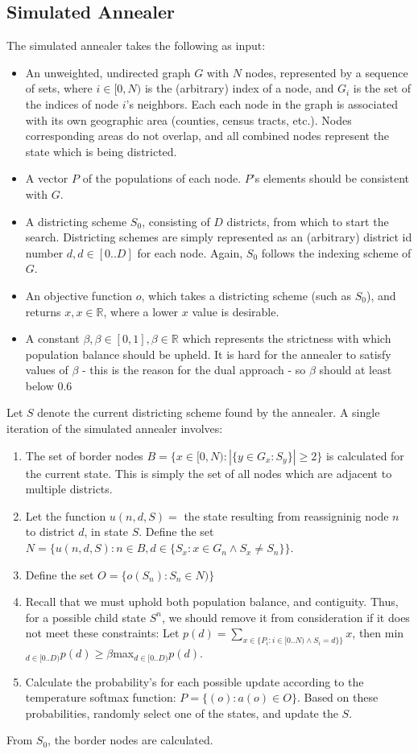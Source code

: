 \documentclass{article}
\begin{document}
\subsection{Simulated Annealer}
The simulated annealer takes the following as input:
\begin{itemize}
    \item An unweighted, undirected graph $G$ with $N$ nodes, represented by a sequence of sets, where $i\in[0, N)$ is the (arbitrary) index of a node, and $G_i$ is the set of the indices of node $i$'s neighbors. Each each node in the graph is associated with its own geographic area (counties, census tracts, etc.). Nodes corresponding areas do not overlap, and all combined nodes represent the state which is being districted.
    \item A vector $P$ of the populations of each node. $P$'s elements should be consistent with $G$.
    \item A districting scheme $S_0$, consisting of $D$ districts, from which to start the search. Districting schemes are simply represented as an (arbitrary) district id number $d, d\in[0..D]$ for each node. Again, $S_0$ follows the indexing scheme of $G$.
    \item An objective function $o$, which takes a districting scheme (such as $S_0$), and returns $x, x\in\mathbb{R}$, where a lower $x$ value is desirable.
    \item A constant $\beta, \beta\in[0, 1], \beta\in\mathbb{R}$ which represents the strictness with which population balance should be upheld. It is hard for the annealer to satisfy values of $\beta$ - this is the reason for the dual approach - so $\beta$ should at least below $0.6$
\end{itemize}
Let $S$ denote the current districting scheme found by the annealer. A single iteration of the simulated annealer involves:
\begin{enumerate}
    \item The set of border nodes $B=\{x\in[0, N): |\{y\in G_x: S_y\}|\geq2\}$ is calculated for the current state. This is simply the set of all nodes which are adjacent to multiple districts.
    \item Let the function $u(n, d, S)=$ the state resulting from reassigninig node $n$ to district $d$, in state $S$. Define the set $N = \{u(n, d, S): n \in B, d\in \{S_x: x\in G_n\land S_x\neq S_n\}\}$.
    \item Define the set $O = \{o(S_n): S_n\in N)\}$
    \item Recall that we must uphold both population balance, and contiguity. Thus, for a possible child state $S^n$, we should remove it from consideration if it does not meet these constraints: Let $p(d) = \sum_{x\in \{P_i: i\in[0..N)\land S_i=d\}\}}x$, then min$_{d\in[0..D)}p(d)\geq \beta$max$_{d\in[0..D)}p(d)$.
    \item Calculate the probability's for each possible update according to the temperature softmax function: $P=\{(o): a(o)\in O\}$. Based on these probabilities, randomly select one of the states, and update the $S$.
\end{enumerate}
From $S_0$, the border nodes are calculated.
\end{document}
